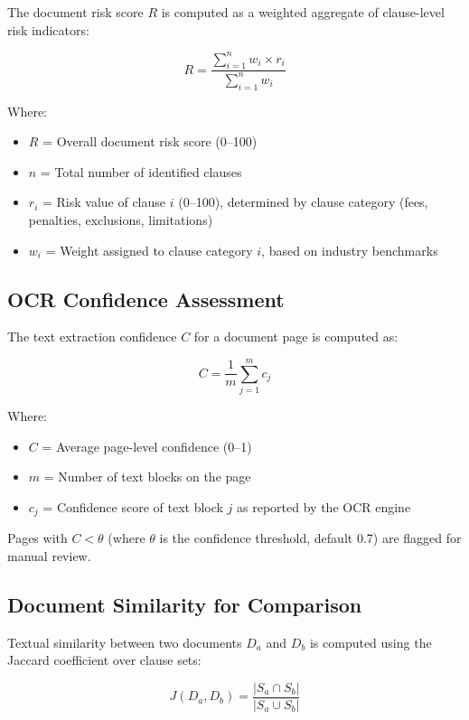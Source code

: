 \documentclass[12pt,a4paper,oneside]{report}
\begin{document}
The document risk score $R$ is computed as a weighted aggregate of clause-level risk indicators:

\begin{equation}
R = \frac{\sum_{i=1}^{n} w_i \times r_i}{\sum_{i=1}^{n} w_i}
\end{equation}

Where:
\begin{itemize}[leftmargin=2cm]
  \item $R$ = Overall document risk score (0--100)
  \item $n$ = Total number of identified clauses
  \item $r_i$ = Risk value of clause $i$ (0--100), determined by clause category (fees, penalties, exclusions, limitations)
  \item $w_i$ = Weight assigned to clause category $i$, based on industry benchmarks
\end{itemize}

\subsection{OCR Confidence Assessment}

The text extraction confidence $C$ for a document page is computed as:

\begin{equation}
C = \frac{1}{m} \sum_{j=1}^{m} c_j
\end{equation}

Where:
\begin{itemize}[leftmargin=2cm]
  \item $C$ = Average page-level confidence (0--1)
  \item $m$ = Number of text blocks on the page
  \item $c_j$ = Confidence score of text block $j$ as reported by the OCR engine
\end{itemize}

Pages with $C < \theta$ (where $\theta$ is the confidence threshold, default 0.7) are flagged for manual review.

\subsection{Document Similarity for Comparison}

Textual similarity between two documents $D_a$ and $D_b$ is computed using the Jaccard coefficient over clause sets:

\begin{equation}
J(D_a, D_b) = \frac{|S_a \cap S_b|}{|S_a \cup S_b|}
\end{equation}
\end{document}
